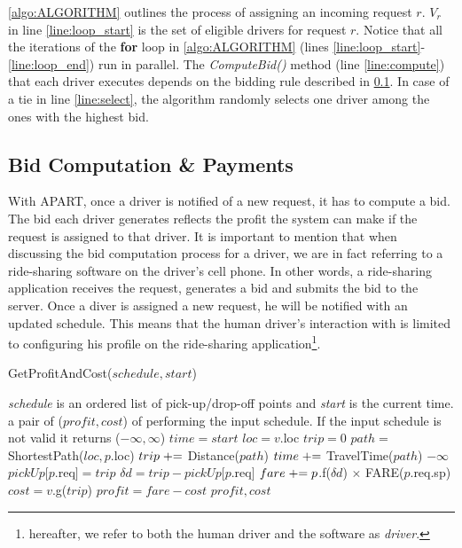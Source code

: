 \cref{algo:ALGORITHM} outlines the process of assigning an incoming request $r$. $V_r$ in line \ref{line:loop_start} is the set of eligible drivers for request $r$. Notice that all the iterations of the \textbf{for} loop in \cref{algo:ALGORITHM} (lines \ref{line:loop_start}-\ref{line:loop_end}) run in parallel. The \emph{ComputeBid()} method (line \ref{line:compute}) that each driver executes depends on the bidding rule described in \cref{subsec:bidcomp}. In case of a tie in line \ref{line:select}, the algorithm randomly selects one driver among the ones with the highest bid.

\subsection{Bid Computation \& Payments}
\label{subsec:bidcomp}

With APART, once a driver is notified of a new request, it has to compute a bid. The bid each driver generates reflects the profit the system can make if the request is assigned to that driver. It is important to mention that when discussing the bid computation process for a driver, we are in fact referring to a ride-sharing software on the driver's cell phone. In other words, a ride-sharing application receives the request, generates a bid and submits the bid to the server. Once a diver is assigned a new request, he will be notified with an updated schedule. This means that the human driver's interaction with \fname is limited to configuring his profile on the ride-sharing application\footnote{hereafter, we refer to both the human driver and the software as \textit{driver}.}.

\begin{algorithm}[!h]
\caption{GetProfitAndCost($schedule, start$)}
\label{algo:get_profit}
\begin{algorithmic}[1]
\REQUIRE \emph{schedule} is an ordered list of pick-up/drop-off points and \emph{start} is the current time.
\ENSURE a pair of ($profit, cost$) of performing the input schedule. If the input schedule is not valid it returns ($-\infty, \infty$)
\STATE $time = start$
\STATE $loc = v.$loc\label{ln:loc}
\STATE $trip = 0$
	\STATE $path =$ ShortestPath($loc, p$.loc)
	\STATE $trip \mathrel{+}=$ Distance($path$)
	\STATE $time \mathrel{+}=$ TravelTime($path$)
			\RETURN $-\infty$
		\ENDIF
		\STATE $pickUp[p$.req$]=trip$
	\ENDIF
		\STATE $\delta d = trip - pickUp[p$.req$]$
		\STATE $fare \mathrel{+}= p$.f($\delta d$) $\times$ FARE($p$.req.sp)
		\STATE $cost = v$.g($trip$)\label{ln:dprof}
	\ENDIF
\ENDFOR
\STATE $profit = fare - cost$
\RETURN $profit, cost$
\end{algorithmic}
\end{algorithm}

